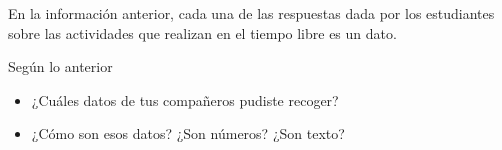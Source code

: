 \documentclass[10pt,twoside]{article}
\begin{document}
En la información anterior, cada una de las respuestas dada
por los estudiantes sobre las actividades que realizan en el
tiempo libre es un dato.

Según lo anterior
\begin{itemize}
 \item  ¿Cuáles datos de tus compañeros pudiste recoger?
 \item ¿Cómo son esos datos? ¿Son números? ¿Son texto?
\end{itemize}
\end{document}
